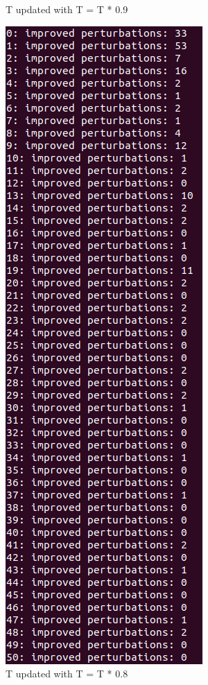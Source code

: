 \documentclass[12pt]{article}
\begin{document}
\begin{figure}[H]
\begin{minipage}{.45\textwidth}
  \caption{T updated with T = T * 0.9}
  \label{fig:p1_sa2}
\end{minipage}\hfill
\begin{minipage}{.45\textwidth}
  \centering
  \includegraphics[width=.75\linewidth]{images/p1_sa3}
  \caption{T updated with T = T * 0.8}
  \label{fig:p1_sa3}
\end{minipage}
\end{figure}
\end{document}
